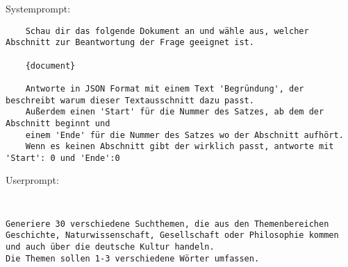 Systemprompt:

\begin{verbatim}
    Schau dir das folgende Dokument an und wähle aus, welcher Abschnitt zur Beantwortung der Frage geeignet ist.

    {document}

    Antworte in JSON Format mit einem Text 'Begründung', der beschreibt warum dieser Textausschnitt dazu passt. 
    Außerdem einen 'Start' für die Nummer des Satzes, ab dem der Abschnitt beginnt und 
    einem 'Ende' für die Nummer des Satzes wo der Abschnitt aufhört.
    Wenn es keinen Abschnitt gibt der wirklich passt, antworte mit 'Start': 0 und 'Ende':0

\end{verbatim}

Userprompt:

\begin{verbatim}
  

\end{verbatim}


\label{ch:chatgpt-topicgeneration}

\begin{verbatim}
Generiere 30 verschiedene Suchthemen, die aus den Themenbereichen Geschichte, Naturwissenschaft, Gesellschaft oder Philosophie kommen und auch über die deutsche Kultur handeln.
Die Themen sollen 1-3 verschiedene Wörter umfassen.
\end{verbatim}